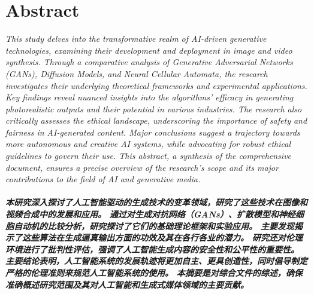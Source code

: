\documentclass[11pt,a4paper,oneside]{report}
\newcommand{\instructions}[1]{{\color{black}\itshape #1}}
\begin{document}

\clearpage
{}


\setcounter{tocdepth}{0} %
\tableofcontents


\chapter*{Abstract}


\instructions{This study delves into the transformative realm of AI-driven generative technologies, 
examining their development and deployment in image and video synthesis. 
Through a comparative analysis of Generative Adversarial Networks (GANs), 
Diffusion Models, and Neural Cellular Automata, the research investigates their underlying theoretical frameworks and experimental applications. 
Key findings reveal nuanced insights into the algorithms' efficacy in generating photorealistic outputs and their potential in various industries. 
The research also critically assesses the ethical landscape, underscoring the importance of safety and fairness in AI-generated content. 
Major conclusions suggest a trajectory towards more autonomous and creative AI systems, while advocating for robust ethical guidelines to govern their use. 
This abstract, a synthesis of the comprehensive document, ensures a precise overview of the research's scope and its major contributions to the field of AI and generative media.}

\vspace{4\bigskipamount}


\paragraph{\textnormal{本研究深入探讨了人工智能驱动的生成技术的变革领域，研究了这些技术在图像和视频合成中的发展和应用。
通过对生成对抗网络（GANs）、扩散模型和神经细胞自动机的比较分析，研究探讨了它们的基础理论框架和实验应用。
主要发现揭示了这些算法在生成逼真输出方面的功效及其在各行各业的潜力。
研究还对伦理环境进行了批判性评估，强调了人工智能生成内容的安全性和公平性的重要性。
主要结论表明，人工智能系统的发展轨迹将更加自主、更具创造性，同时倡导制定严格的伦理准则来规范人工智能系统的使用。
本摘要是对综合文件的综述，确保准确概述研究范围及其对人工智能和生成式媒体领域的主要贡献。}}
\end{document}
